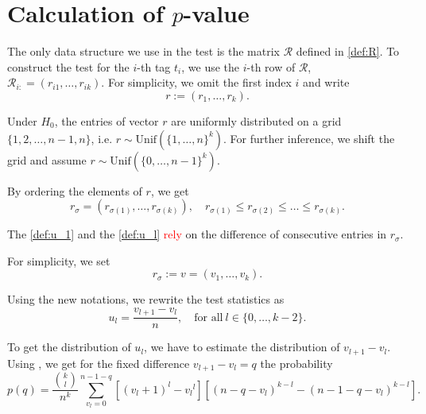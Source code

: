 \section{Calculation of $p$-value}
\label{sec:theory}

 

The only data structure we use in the test is the matrix $\mathcal{R}$ defined in \eqref{def:R}. To construct the test for the $i$-th tag $t_i$, we use the $i$-th row of $\mathcal{R}$, $\mathcal{R}_{i:} = (r_{i1}, \dots, r_{ik})$. For simplicity, we omit the first index $i$ and write
\[
r := (r_{1}, \dots, r_{k}).
\]

Under $H_0$, the entries of vector $r$ are uniformly distributed on a grid $\{1, 2, \dots, n-1, n\}$, i.e. $r\sim \text{Unif}(\{1, \dots, n\}^k)$. For further inference, we shift the grid and assume $r\sim \text{Unif}(\{0, \dots, n-1\}^k)$.

By ordering the elements of $r$, we get
\[
r_{\sigma} = (r_{\sigma(1)}, \dots, r_{\sigma(k)}), 
\quad
r_{\sigma(1)} \leq r_{\sigma(2)} \leq \dots \leq r_{\sigma(k)}.
\]

The  \eqref{def:u_1} and the  \eqref{def:u_l} 
\textcolor{red}{rely} on the difference of consecutive entries in $r_{\sigma}$.

For simplicity, we set
\begin{equation}
\label{def:u}
    r_{\sigma} := v = (v_1, \dots, v_k).
\end{equation}

Using the new notations, we rewrite the test statistics as
\[
u_l = \frac{v_{l+1} - v_{l}}{n}, \quad
\text{for all}~ l\in \{0, \dots, k-2\}.
\]

To get the distribution of $u_l$, we have to estimate the distribution of $v_{l+1}- v_l$. Using \cite{khatri1962distributions}, we get
for the fixed difference $v_{l+1}-v_{l} = q$ the probability  
\[
p(q) = \frac{\binom{k}{l}}{n^k}\sum^{n-1-q}_{v_l = 0} \left[(v_l + 1)^{l} - {v_l}^l \right] \left[ (n-q-v_l)^{k-l} - (n-1-q-v_l)^{k-l}\right].
\]

